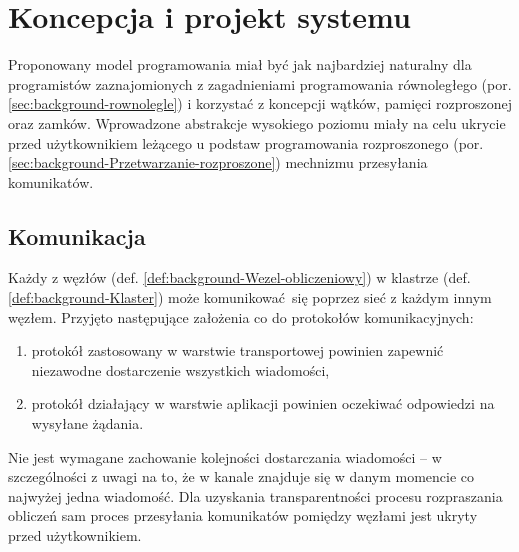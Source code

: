 
\chapter{Koncepcja i projekt systemu}

\label{chap:concept}Proponowany model programowania miał być jak
najbardziej naturalny dla programistów zaznajomionych z zagadnieniami
programowania równoległego (por. \ref{sec:background-rownolegle})
i korzystać z koncepcji wątków, pamięci rozproszonej oraz zamków.
Wprowadzone abstrakcje wysokiego poziomu miały na celu ukrycie przed
użytkownikiem leżącego u podstaw programowania rozproszonego (por.
\ref{sec:background-Przetwarzanie-rozproszone}) mechnizmu przesyłania
komunikatów. 


\section{Komunikacja}

\label{sub:concept-Komunikacja}Każdy z węzłów (def. \ref{def:background-Wezel-obliczeniowy})
w klastrze (def. \ref{def:background-Klaster}) może komunikować\ się
poprzez sieć z każdym innym węzłem. Przyjęto następujące założenia
co do protokołów komunikacyjnych:
\begin{enumerate}
\item protokół zastosowany w warstwie transportowej powinien zapewnić niezawodne
dostarczenie wszystkich wiadomości,
\item protokół działający w warstwie aplikacji powinien oczekiwać odpowiedzi
na wysyłane żądania. 
\end{enumerate}
Nie jest wymagane zachowanie kolejności dostarczania wiadomości --
w szczególności z uwagi na to, że w kanale znajduje się w danym momencie
co najwyżej jedna wiadomość. Dla uzyskania transparentności procesu
rozpraszania obliczeń sam proces przesyłania komunikatów pomiędzy
węzłami jest ukryty przed użytkownikiem.

